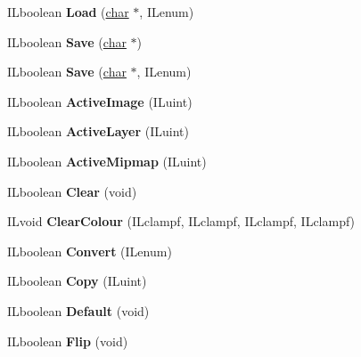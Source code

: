 \begin{DoxyCompactItemize}
I\+Lboolean {\bfseries Load} (\hyperlink{classchar}{char} $\ast$, I\+Lenum)
\item 
\mbox{\label{classilImage_af962d795b6f8c82be013ec511720ddf6}} 
I\+Lboolean {\bfseries Save} (\hyperlink{classchar}{char} $\ast$)
\item 
\mbox{\label{classilImage_a2f3e826c18ca6820a473e626134cd4f4}} 
I\+Lboolean {\bfseries Save} (\hyperlink{classchar}{char} $\ast$, I\+Lenum)
\item 
\mbox{\label{classilImage_a5635938ffee8a3856811e5c51658a0f8}} 
I\+Lboolean {\bfseries Active\+Image} (I\+Luint)
\item 
\mbox{\label{classilImage_a52781721e97af4840259699518ff63d8}} 
I\+Lboolean {\bfseries Active\+Layer} (I\+Luint)
\item 
\mbox{\label{classilImage_a5ee7041f179112a50218964e3d8aab81}} 
I\+Lboolean {\bfseries Active\+Mipmap} (I\+Luint)
\item 
\mbox{\label{classilImage_a202758160e65bda0a4135e133cd87112}} 
I\+Lboolean {\bfseries Clear} (void)
\item 
\mbox{\label{classilImage_a61e2c49839a48e56af595f95e52fde76}} 
I\+Lvoid {\bfseries Clear\+Colour} (I\+Lclampf, I\+Lclampf, I\+Lclampf, I\+Lclampf)
\item 
\mbox{\label{classilImage_a6b0991b943109549e874ae3a5c161ee6}} 
I\+Lboolean {\bfseries Convert} (I\+Lenum)
\item 
\mbox{\label{classilImage_a0cb50014832fdb0ac45a345804c8da50}} 
I\+Lboolean {\bfseries Copy} (I\+Luint)
\item 
\mbox{\label{classilImage_a981280302a80e0d2e68d1229cb70c60f}} 
I\+Lboolean {\bfseries Default} (void)
\item 
\mbox{\label{classilImage_a83331e94a466f7d3e55975928d476711}} 
I\+Lboolean {\bfseries Flip} (void)
\item 
\mbox{\label{classilImage_a470e3a5cc20ec88017d216b1af497f9e}} 

\end{DoxyCompactItemize}

